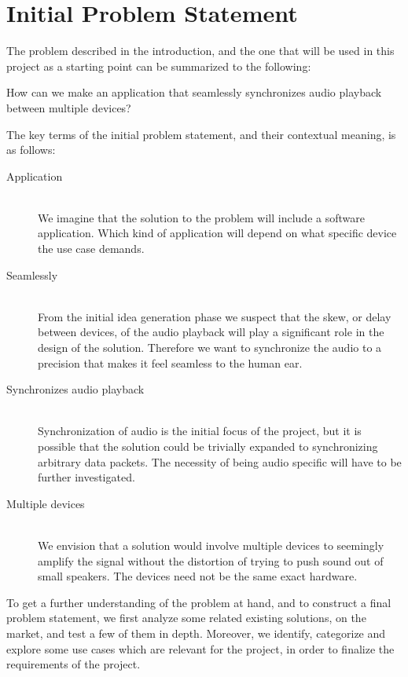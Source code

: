 \section{Initial Problem Statement}\label{sec:initial_problem}

The problem described in the introduction, and the one that will be used
in this project as a starting point can be summarized to the following:

\begin{problemstatement}
	How can we make an application that seamlessly synchronizes audio
	playback between multiple devices?
\end{problemstatement}

The key terms of the initial problem statement, and their contextual meaning,
is as follows:
\begin{description}
	\item[Application] \hfill \\
		We imagine that the solution to the problem will include a software
		application. Which kind of application will depend on what specific
		device the use case demands.
	\item[Seamlessly]  \hfill \\
		From the initial idea generation phase we suspect
		that the skew, or delay between devices, of the audio playback will
		play a significant role in the design of the solution. Therefore we
		want to synchronize the audio to a precision that makes it feel
		seamless to the human ear.
	\item[Synchronizes audio playback]  \hfill \\
		Synchronization of audio is the initial
		focus of the project, but it is possible that the solution could be
		trivially expanded to synchronizing arbitrary data packets. The
		necessity of being audio specific will have to be further investigated.
	\item[Multiple devices]  \hfill \\
		We envision that a solution would involve multiple devices to seemingly 
		amplify the signal without the distortion of trying to push sound out of
		small speakers. The devices need not be the same exact hardware.
\end{description}

To get a further understanding of the problem at hand, and to
construct a final problem statement, we first analyze some related
existing solutions, on the market, and test a few of them in depth. 
Moreover, we identify, categorize and explore some use cases which are relevant for the project,
in order to finalize the requirements of the project.
